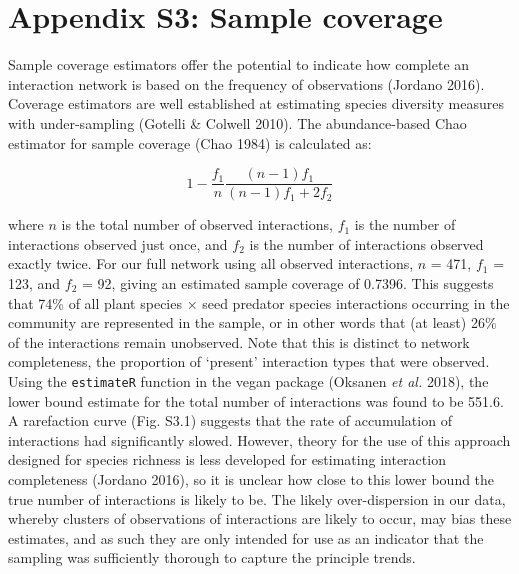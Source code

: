 \documentclass[11pt]{article}
\begin{document}
\newpage

\section{Appendix S3: Sample coverage}

Sample coverage estimators offer the potential to indicate how complete an interaction network is based on the frequency of observations (Jordano 2016). Coverage estimators are well established at estimating species diversity measures with under-sampling (Gotelli \& Colwell 2010). The abundance-based Chao estimator for sample coverage (Chao 1984) is calculated as: 


$$ 1 - \frac{f_1}{n } \frac{(n-1) f_1}{(n-1) f_1  + 2f_2  }$$ 


where $n$ is the total number of observed interactions, $f_1$ is the number of interactions observed just once, and $f_2$ is the number of interactions observed exactly twice. 
For our full network using all observed interactions, $n$ = 471, $f_1$ = 123, and $f_2$ = 92, giving an estimated sample coverage of 0.7396. This suggests that 74\% of all plant species $\times$ seed predator species interactions occurring in the community are represented in the sample, or in other words that (at least) 26\% of the interactions remain unobserved. Note that this is distinct to network completeness, the proportion of ‘present’ interaction types that were observed. 
Using the \texttt{estimateR} function in the vegan package (Oksanen \emph{et al. }2018), the lower bound estimate for the total number of interactions was found to be 551.6. A rarefaction curve (Fig. S3.1) suggests that the rate of accumulation of interactions had significantly slowed. However, theory for the use of this approach designed for species richness is less developed for estimating interaction completeness (Jordano 2016), so it is unclear how close to this lower bound the true number of interactions is likely to be. The likely over-dispersion in our data, whereby clusters of observations of interactions are likely to occur, may bias these estimates, and as such they are only intended for use as an indicator that the sampling was sufficiently thorough to capture the principle trends.  
\end{document}
